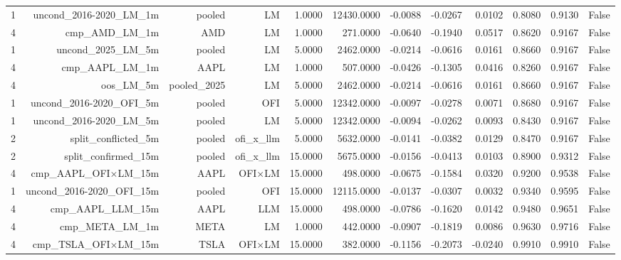 \begin{table}[htbp]
\begin{tabular}{lrrrrrrrrrrr}
1 & uncond\_2016-2020\_LM\_1m & pooled & LM & 1.0000 & 12430.0000 & -0.0088 & -0.0267 & 0.0102 & 0.8080 & 0.9130 & False \\
4 & cmp\_AMD\_LM\_1m & AMD & LM & 1.0000 & 271.0000 & -0.0640 & -0.1940 & 0.0517 & 0.8620 & 0.9167 & False \\
1 & uncond\_2025\_LM\_5m & pooled & LM & 5.0000 & 2462.0000 & -0.0214 & -0.0616 & 0.0161 & 0.8660 & 0.9167 & False \\
4 & cmp\_AAPL\_LM\_1m & AAPL & LM & 1.0000 & 507.0000 & -0.0426 & -0.1305 & 0.0416 & 0.8260 & 0.9167 & False \\
4 & oos\_LM\_5m & pooled\_2025 & LM & 5.0000 & 2462.0000 & -0.0214 & -0.0616 & 0.0161 & 0.8660 & 0.9167 & False \\
1 & uncond\_2016-2020\_OFI\_5m & pooled & OFI & 5.0000 & 12342.0000 & -0.0097 & -0.0278 & 0.0071 & 0.8680 & 0.9167 & False \\
1 & uncond\_2016-2020\_LM\_5m & pooled & LM & 5.0000 & 12342.0000 & -0.0094 & -0.0262 & 0.0093 & 0.8430 & 0.9167 & False \\
2 & split\_conflicted\_5m & pooled & ofi\_x\_llm & 5.0000 & 5632.0000 & -0.0141 & -0.0382 & 0.0129 & 0.8470 & 0.9167 & False \\
2 & split\_confirmed\_15m & pooled & ofi\_x\_llm & 15.0000 & 5675.0000 & -0.0156 & -0.0413 & 0.0103 & 0.8900 & 0.9312 & False \\
4 & cmp\_AAPL\_OFI×LM\_15m & AAPL & OFI×LM & 15.0000 & 498.0000 & -0.0675 & -0.1584 & 0.0320 & 0.9200 & 0.9538 & False \\
1 & uncond\_2016-2020\_OFI\_15m & pooled & OFI & 15.0000 & 12115.0000 & -0.0137 & -0.0307 & 0.0032 & 0.9340 & 0.9595 & False \\
4 & cmp\_AAPL\_LLM\_15m & AAPL & LLM & 15.0000 & 498.0000 & -0.0786 & -0.1620 & 0.0142 & 0.9480 & 0.9651 & False \\
4 & cmp\_META\_LM\_1m & META & LM & 1.0000 & 442.0000 & -0.0907 & -0.1819 & 0.0086 & 0.9630 & 0.9716 & False \\
4 & cmp\_TSLA\_OFI×LM\_15m & TSLA & OFI×LM & 15.0000 & 382.0000 & -0.1156 & -0.2073 & -0.0240 & 0.9910 & 0.9910 & False \\
\bottomrule
\end{tabular}
\end{table}
